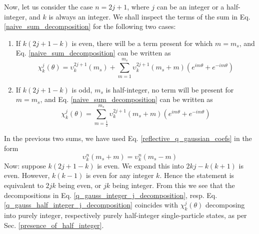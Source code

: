 \documentclass[12pt]{article}
\begin{document}
	Now, let us consider the case $n=2j+1$, where $j$ can be an integer or a half-integer, and $k$ is always an integer. We shall inspect the terms of the sum in Eq. \ref{naive_sum_decomposition} for the following two cases:
	\begin{enumerate}
	\item If $k(2j+1-k)$ is even, there will be a term present for which ${m=m_s}$, and Eq. \ref{naive_sum_decomposition} can be written as
	\begin{equation} \label{q_gauss_integer_j_decomposition}
	\chi^j_k(\theta) = \upsilon^{2j+1}_k\left(m_s\right) + \sum_{m=1}^{m_s} \upsilon^{2j+1}_k\left(m_s+m\right)\left(e^{im\theta}+e^{-im\theta}\right)
	\end{equation}
	\item If $k(2j+1-k)$ is odd, $m_s$ is half-integer, no term will be present for $m=m_s$, and Eq. \ref{naive_sum_decomposition} can be written as
	\begin{equation} \label{q_gauss_half_integer_j_decomposition}
	\chi^j_k(\theta) = \sum_{m=\frac{1}{2}}^{m_s} \upsilon^{2j+1}_k\left(m_s+m\right)\left(e^{im\theta}+e^{-im\theta}\right)
	\end{equation}
	\end{enumerate}
	In the previous two sums, we have used Eq. \ref{reflective_q_gaussian_coefs} in the form
	\begin{equation}
	\upsilon^{n}_k(m_s+m)=\upsilon^{n}_k(m_s-m)
	\end{equation}
	Now: suppose $k(2j+1-k)$ is even. We expand this into $2kj-k(k+1)$ is even. However, $k(k-1)$ is even for any integer $k$. Hence the statement is equivalent to $2jk$ being even, or $jk$ being integer. From this we see that the decompositions in Eq. \ref{q_gauss_integer_j_decomposition}, resp. Eq. \ref{q_gauss_half_integer_j_decomposition} coincides with $\chi^j_k(\theta)$ decomposing into purely integer, respectively purely half-integer single-particle states, as per Sec. \ref{presence_of_half_integer}.
	
\end{document}
